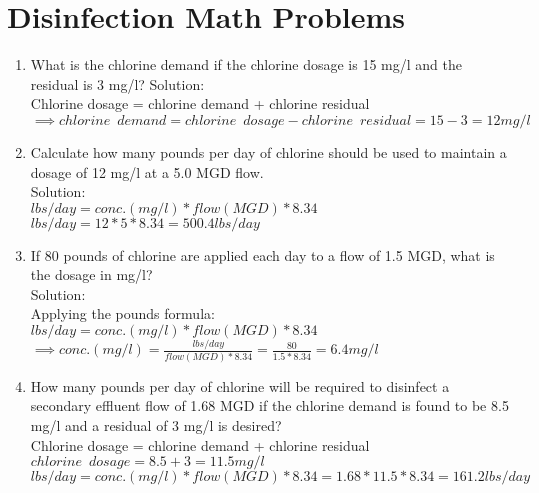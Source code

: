 \section*{Disinfection Math Problems}
\begin{enumerate}
\item What is the chlorine demand if the chlorine dosage is 15 mg/l and the residual is 3 mg/l?
Solution:\\
Chlorine dosage = chlorine demand + chlorine residual\\
$\implies chlorine \enspace demand = chlorine \enspace dosage - chlorine \enspace residual=15-3=\boxed{12mg/l}$
\vspace{0.25cm}
\item Calculate how many pounds per day of chlorine should be used to maintain a dosage of 12 mg/l at a 5.0 MGD flow.\\
Solution:\\
$lbs/day=conc. (mg/l)*flow(MGD)*8.34$\\
$lbs/day=12*5*8.34=\boxed{500.4lbs/day}$\\
\vspace{0.25cm}
\item If 80 pounds of chlorine are applied each day to a flow of 1.5 MGD, what is the dosage in mg/l?\\
\vspace{0.25cm}
Solution:\\
\vspace{0.25cm}
Applying the pounds formula:\\  $lbs/day=conc. (mg/l)*flow(MGD)*8.34$\\
\vspace{0.25cm}
$\implies conc. (mg/l)=\frac{lbs/day}{flow(MGD)*8.34}=\frac{80}{1.5*8.34}=\boxed{6.4mg/l}$
\vspace{0.25cm}
\item How many pounds per day of chlorine will be required to disinfect a secondary effluent flow of 1.68 MGD if the chlorine demand is found to be 8.5 mg/l and a residual of 3 mg/l is desired?\\
\vspace{0.25cm}
Chlorine dosage = chlorine demand + chlorine residual\\
\vspace{0.25cm}
$chlorine \enspace dosage=8.5+3=11.5mg/l$\\
$lbs/day=conc. (mg/l)*flow(MGD)*8.34=1.68*11.5*8.34=\boxed{161.2lbs/day}$\\
\vspace{0.25cm}

\end{enumerate}
